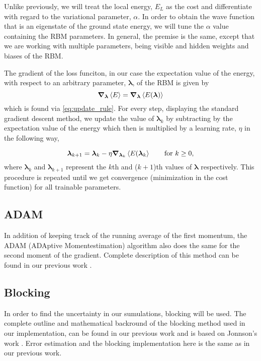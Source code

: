 Unlike previously, we will treat the local energy, $E_L$ as the cost and differentiate with regard to the variational parameter, $\alpha$. In order to obtain the wave function that is an eigenstate of the ground state energy, we will tune the $\alpha$ value containing the RBM parameters. In general, the premise is the same, except that we are working with multiple parameters, being visible and hidden weights and biases of the RBM. 

The gradient of the loss funciton, in our case the expectation value of the energy, with respect to an arbitrary parameter, $\bm{\lambda}$, of the RBM is given by
\begin{equation*}
    \grad_{\bm{\lambda}}\expval{E} = \grad_{\bm{\lambda}}\expval{E\qty(\bm{\lambda})}
\end{equation*}
which is found via \autoref{eq:update_rule}. 
For every step, displaying the standard gradient descent method, we update the value of $\bm{\lambda}_k$ by subtracting by the expectation value of the energy which then is multiplied by a learning rate, $\eta $ in the following way,

\begin{equation*}
    \bm{\lambda}_{k+1} =  \bm{\lambda}_k - \eta \grad_{\bm{\lambda}_k}\expval{E(\bm{\lambda}_k} \qquad \text{for} \,\, k \geq 0, 
\end{equation*}
where $\bm{\lambda}_k$ and $\bm{\lambda}_{k+1}$ represent the $k$th and ($k+1$)th values of $\bm{\lambda}$ respectively. This procedure is repeated until we get convergence (minimization in the cost function) for all trainable parameters.

\subsection{ADAM}
In addition of keeping track of the running average of the first momentum, the ADAM (ADAptive Momentestimation) algorithm also does the same for the second moment of the gradient. Complete description of this method can be found in our previous work \citep{project1}. 


\subsection{Blocking}
In order to find the uncertainty in our sumulations, blocking will be used. The complete outline and mathematical backround of the blocking method used in our implementation, can be found in our previous work \citep{project1} and is based on Jonnson’s work \citep{MariusJonsson}. Error estimation and the blocking implementation here is the same as in our previous work. 


